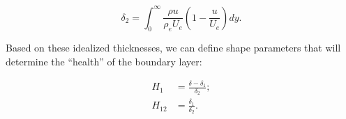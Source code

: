 \begin{equation}
    \delta_2 = \int_0^\infty \frac{\rho u}{\rho_e U_e} \left(1-\frac{u}{U_e}\right) dy.
\end{equation}



Based on these idealized thicknesses, we can define shape parameters that will determine the ``health'' of the boundary layer:


\begin{align}
    H_1 &= \frac{\delta-\delta_1}{\delta_2}; \\
    H_{12} &= \frac{\delta_1}{\delta_2}.
\end{align}






